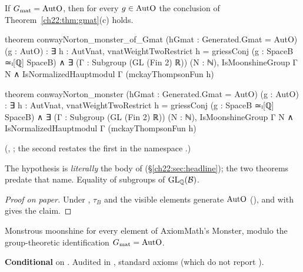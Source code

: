 \begin{theorem}[Conway--Norton for all of $\chtwentytwoAutO$, given $\chtwentytwoGmat=\chtwentytwoAutO$]\label{ch22:thm:cnmonster}
If $\chtwentytwoGmat=\chtwentytwoAutO$, then for every $g\in\mathrm{AutO}$ the conclusion of
Theorem~\ref{ch22:thm:gmat}(c) holds.
\end{theorem}
\begin{leancode}
theorem conwayNorton_monster_of_Gmat (hGmat : Generated.Gmat = AutO) (g : AutO) :
    ∃ h : AutVnat, vnatWeightTwoRestrict h = griessConj (g : SpaceB ≃ₗ[ℚ] SpaceB) ∧
      ∃ (Γ : Subgroup (GL (Fin 2) ℝ)) (N : ℕ), IsMoonshineGroup Γ N ∧
        IsNormalizedHauptmodul Γ (mckayThompsonFun h)
\end{leancode}
\begin{leancode}
theorem conwayNorton_monster (hGmat : Generated.Gmat = AutO) (g : AutO) :
    ∃ h : AutVnat, vnatWeightTwoRestrict h = griessConj (g : SpaceB ≃ₗ[ℚ] SpaceB) ∧
      ∃ (Γ : Subgroup (GL (Fin 2) ℝ)) (N : ℕ), IsMoonshineGroup Γ N ∧
        IsNormalizedHauptmodul Γ (mckayThompsonFun h)
\end{leancode}
(, ; the
second restates the first in the namespace .)
\begin{dictionary}
The hypothesis  is \emph{literally} the body of 
(\S\ref{ch22:sec:headline}); the two theorems predate that name.  Equality of subgroups of $\mathrm{GL}_{\mathbb{Q}}(\mathcal{B})$.
\end{dictionary}
\begin{proof}[Proof on paper]
Under , $\tau_B$ and the visible elements generate $\chtwentytwoAutO$ (), and
 with  gives the claim.
\end{proof}
\begin{physics}Monstrous moonshine for every element of AxiomMath's Monster, modulo the group-theoretic identification
$\chtwentytwoGmat=\chtwentytwoAutO$.\end{physics}
\begin{status}\textbf{Conditional} on .  Audited in ,
standard axioms (which do not report ).\end{status}

